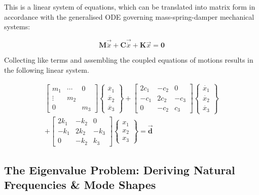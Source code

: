 \documentclass{article}
\begin{document}
\noindent This is a linear system of equations, which can be translated into matrix form in accordance with the generalised ODE governing mass-spring-damper mechanical systems:

\begin{equation}
    \mathbf{M}\Vec{\ddot{x}} + \mathbf{C}\Vec{\dot{x}} + \mathbf{K}\Vec{x} = \mathbf{0}
\end{equation}

\noindent Collecting like terms and assembling the coupled equations of motions results in the following linear system.

\begin{multline}
    \begin{bmatrix}
        m_{1} & \cdots & 0 \\
        \vdots & m_{2} & \\
        0 & & m_{3}
    \end{bmatrix}
    \left\{ \begin{array}{c}
         \ddot{x_1} \\
         \ddot{x_2} \\
         \ddot{x_3}
    \end{array} \right\}
    +
    \begin{bmatrix}
        2c_{1} & -c_{2} & 0 \\
        -c_{1} & 2c_{2} & -c_{3} \\
        0 & -c_{2} & c_{3}
    \end{bmatrix}
    \left\{ \begin{array}{c}
         \dot{x_1} \\
         \dot{x_2} \\
         \dot{x_3}
    \end{array} \right\} \\
    + \begin{bmatrix}
        2k_{1} & -k_{2} & 0 \\
        -k_{1} & 2k_{2} & -k_{3} \\
        0 & -k_{2} & k_{3}
    \end{bmatrix}
    \left\{ \begin{array}{c}
         x_1 \\
         x_2 \\
         x_3
    \end{array} \right\}
    = \mathbf{\vec{d}}
\end{multline}


\pagebreak
\subsection{The Eigenvalue Problem: Deriving Natural Frequencies \& Mode Shapes}
\label{2_natFreq_mode}
\end{document}
